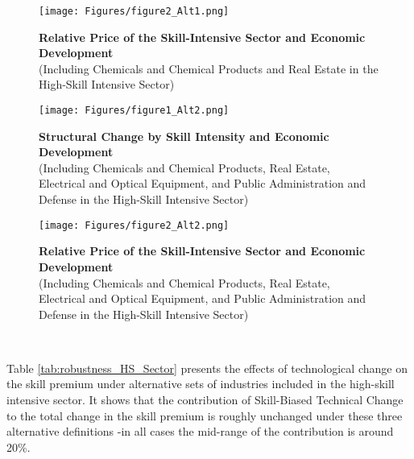 \documentclass[10pt]{article}
\begin{document}
\begin{figure}[!h] 
\caption{\centering \textbf{Relative Price of the Skill-Intensive Sector and Economic Development} \\ (Including Chemicals and Chemical Products and Real Estate in the High-Skill Intensive Sector)}
\centering
\texttt{[image: Figures/figure2\_Alt1.png]}
\label{fig:figure2_alt1}
\end{figure}

\begin{figure}[!h] 
\caption{\centering \textbf{Structural Change by Skill Intensity and Economic Development} \\ (Including Chemicals and Chemical Products, Real Estate, Electrical and Optical Equipment, and Public Administration and Defense in the High-Skill Intensive Sector)}
\centering
\texttt{[image: Figures/figure1\_Alt2.png]}
\label{fig:figure1_alt2}
\end{figure}

\begin{figure}[!h] 
\caption{\centering \textbf{Relative Price of the Skill-Intensive Sector and Economic Development} \\ (Including Chemicals and Chemical Products, Real Estate, Electrical and Optical Equipment, and Public Administration and Defense in the High-Skill Intensive Sector)}
\centering
\texttt{[image: Figures/figure2\_Alt2.png]}
\label{fig:figure2_alt2}
\end{figure}\\
\clearpage 

Table \ref{tab:robustness_HS_Sector} presents the effects of technological change on the skill premium under alternative sets of industries included in the high-skill intensive sector. It shows that the contribution of Skill-Biased Technical Change to the total change in the skill premium is roughly unchanged under these three alternative definitions -in all cases the mid-range of the contribution is around 20\%.\\
\end{document}
